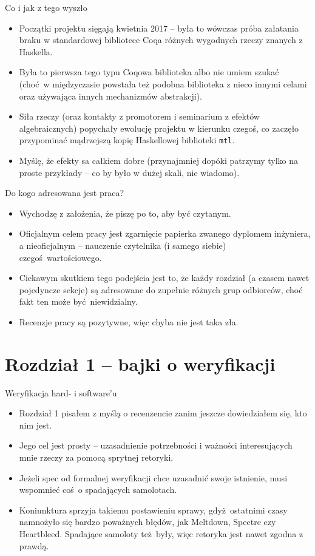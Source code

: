 \documentclass{beamer}
\begin{document}
\begin{frame}{Co i jak z tego wyszło}
\begin{itemize}
	\item Początki projektu sięgają kwietnia 2017 -- była to wówczas próba załatania braku w standardowej bibliotece Coqa różnych wygodnych rzeczy znanych z Haskella.
	\item Była to pierwsza tego typu Coqowa biblioteka albo nie umiem szukać (choć w międzyczasie powstała też podobna biblioteka z nieco innymi celami oraz używająca innych mechanizmów abstrakcji).
	\item Siła rzeczy (oraz kontakty z promotorem i seminarium z efektów algebraicznych) popychały ewolucję projektu w kierunku czegoś, co zaczęło przypominać mądrzejszą kopię Haskellowej biblioteki \texttt{mtl}.
	\item Myślę, że efekty sa całkiem dobre (przynajmniej dopóki patrzymy tylko na proste przykłady -- co by było w dużej skali, nie wiadomo).
\end{itemize}
\end{frame}

\begin{frame}{Do kogo adresowana jest praca?}
\begin{itemize}
	\item Wychodzę z założenia, że piszę po to, aby być czytanym.
	\item Oficjalnym celem pracy jest zgarnięcie papierka zwanego dyplomem inżyniera, a nieoficjalnym -- nauczenie czytelnika (i samego siebie) czegoś wartościowego.
	\item Ciekawym skutkiem tego podejścia jest to, że każdy rozdział (a czasem nawet pojedyncze sekcje) są adresowane do zupełnie różnych grup odbiorców, choć fakt ten może być niewidzialny.
	\item Recenzje pracy są pozytywne, więc chyba nie jest taka zła.
\end{itemize}
\end{frame}

\section{Rozdział 1 -- bajki o weryfikacji}

\begin{frame}{Weryfikacja hard- i software'u}
\begin{itemize}
	\item Rozdział 1 pisałem z myślą o recenzencie zanim jeszcze dowiedziałem się, kto nim jest.
	\item Jego cel jest prosty -- uzasadnienie potrzebności i ważności interesujących mnie rzeczy za pomocą sprytnej retoryki.
	\item Jeżeli spec od formalnej weryfikacji chce uzasadnić swoje istnienie, musi wspomnieć coś o spadających samolotach.
	\item Koniunktura sprzyja takiemu postawieniu sprawy, gdyż ostatnimi czasy namnożyło się bardzo poważnych błędów, jak Meltdown, Spectre czy Heartbleed. Spadające samoloty też były, więc retoryka jest nawet zgodna z prawdą.
\end{itemize}
\end{frame}
\end{document}
